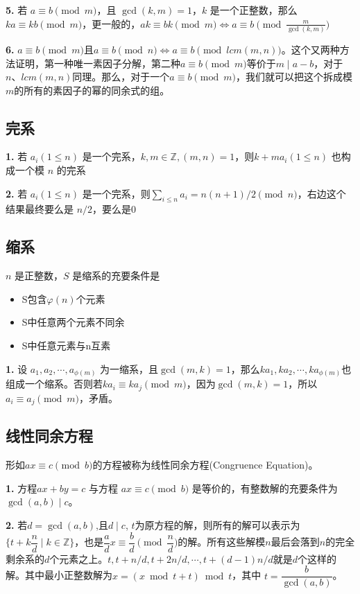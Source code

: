 \documentclass{article}
\begin{document}
\textbf{5.} 若 $a\equiv b\pmod m$，且 $\gcd(k,m)=1$，$k$ 是一个正整数，那么 $ka\equiv kb\pmod m$，更一般的，$ak\equiv bk\pmod m \Leftrightarrow a \equiv b\pmod{\frac{m}{\gcd(k,m)}}$

\textbf{6.} $a\equiv b\pmod{m}$且$a\equiv b\pmod{n}\Leftrightarrow a\equiv b\pmod{lcm(m,n)}$。这个又两种方法证明，第一种唯一素因子分解，第二种$a\equiv b\pmod{m}$等价于$m\mid a-b$，对于$n、lcm(m,n)$同理。那么，对于一个$a\equiv b\pmod{m}$，我们就可以把这个拆成模$m$的所有的素因子的幂的同余式的组。

\subsection{完系}

\textbf{1.} 若 $a_i (1\le n)$ 是一个完系，$k, m\in \mathbb{Z}, (m, n)=1$，则$k + ma_i(1\le n)$ 也构成一个模 $n$ 的完系

\textbf{2.} 若 $a_i (1\le n)$ 是一个完系，则$\sum_{i\le n}a_i=n(n+1)/2\pmod n$，右边这个结果最终要么是 $n/2$，要么是0

\subsection{缩系}

$n$ 是正整数，$S$ 是缩系的充要条件是

\begin{itemize}
    \item S包含$\varphi (n)$个元素
    \item S中任意两个元素不同余
    \item S中任意元素与n互素
\end{itemize}


\textbf{1.} 设 $a_1,a_2,\cdots,a_{\phi(m)}$ 为一缩系，且$\gcd(m, k)=1$，那么$ka_1,ka_2,\cdots,ka_{\phi(m)}$也组成一个缩系。否则若$ka_i\equiv ka_j\pmod m$，因为$\gcd(m, k)=1$，所以$a_i\equiv a_j\pmod m$，矛盾。

\subsection{线性同余方程}

形如$ax \equiv c \pmod b$的方程被称为线性同余方程(Congruence Equation)。

\textbf{1.} 方程$ax+by=c$ 与方程 $ax \equiv c \pmod b$ 是等价的，有整数解的充要条件为 $\gcd(a,b) \mid c$。

\textbf{2.} 若$d=\gcd(a,b)$,且$d\mid c$, $t$为原方程的解，则所有的解可以表示为$\{t+k\dfrac{n}{d}\mid k\in \mathbb{Z}\}$，也是$\dfrac{a}{d}x\equiv \dfrac{b}{d}\pmod{\dfrac{n}{d}}$的解。所有这些解模$n$最后会落到$n$的完全剩余系的$d$个元素之上。$t, t+n/d, t+2n/d, \cdots, t+(d-1)n/d$就是$d$个这样的解。其中最小正整数解为$x=(x \bmod t+t) \bmod t$，其中 $t=\dfrac{b}{\gcd(a,b)}$。
\end{document}
